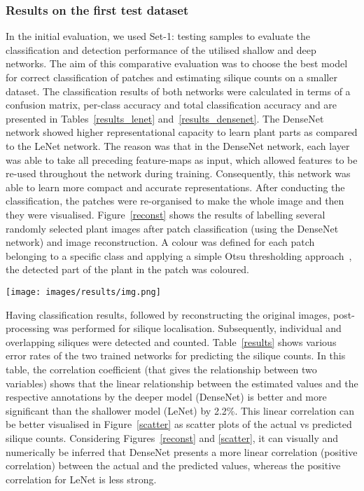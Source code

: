 \documentclass[a4paper,num-refs]{oup-contemporary}
\begin{document}
\subsubsection{Results on the first test dataset}\label{part1}
In the initial evaluation, we used Set-1: testing samples to evaluate the classification and detection performance of the utilised shallow and deep networks. The aim of this comparative evaluation was to choose the best model for correct classification of patches and estimating silique counts on a smaller dataset.
The classification results of both networks were calculated in terms of a confusion matrix, per-class accuracy and total classification accuracy and are presented in Tables~\ref{results_lenet} and~\ref{results_densenet}. The DenseNet network showed  higher representational capacity to learn plant parts as compared to the LeNet network. The reason was that in the DenseNet network, each layer was able to take all preceding feature-maps as input, which allowed features to be re-used throughout the network during training. Consequently, this network was able to learn more compact and accurate representations. 
After conducting the classification, the patches were re-organised to make the whole image and then they were visualised. 
Figure~\ref{reconst} shows the results of labelling several randomly selected plant images after patch classification (using the DenseNet network) and image reconstruction. A colour was defined for each patch belonging to a specific class and applying a simple Otsu thresholding approach~\cite{sahoo1988survey}, the detected part of the plant in the patch was coloured.
\begin{figure*}[!ht]
\centering
	\texttt{[image: images/results/img.png]}
\caption{Results of labelling on different reconstructed plant images using DenseNet. Red, green, blue and white represent tip, body, base and stem, respectively.}
\label{reconst}
\end{figure*}
Having classification results, followed by reconstructing the original images, post-processing was performed for silique localisation. Subsequently, individual and overlapping siliques were detected and counted.
Table~\ref{results} shows various error rates of the two trained networks for predicting the silique counts.  
In this table, the correlation coefficient (that gives the relationship between two variables) shows that the  linear relationship between the estimated values and the respective annotations by the deeper model (DenseNet) is better and more significant than the shallower model (LeNet) by 2.2\%. This linear correlation can be better visualised in Figure~\ref{scatter} as scatter plots of the actual vs predicted silique counts. Considering Figures~\ref{reconst} and \ref{scatter}, it can visually and numerically be inferred that  DenseNet presents a more linear correlation (positive correlation) between the actual and the predicted values, whereas the positive correlation for  LeNet is less strong.
\end{document}
